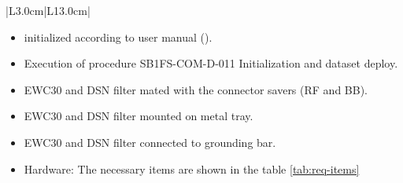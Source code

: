 \begin{table}[H]
\begin{tabular}{|L{3.0cm}|L{13.0cm}|}
\begin{minipage}[t]{\linewidth}
\begin{itemize}[nosep,after=\strut]
 	\item \comEgse initialized according to \comEgse{} user manual ().
				\item Execution of procedure SB1FS-COM-D-011 Initialization and dataset deploy.
				\item EWC30 and DSN filter mated with the connector savers (RF and BB).
				\item EWC30 and DSN filter mounted on \comEgse{} metal tray.
				\item EWC30 and DSN filter connected to grounding bar.
				\item Hardware: The necessary items are shown in the table \ref{tab:req-items} 
			\end{itemize} 
		\end{minipage}\\\hline
	\end{tabular}
	\caption{Procedure \procid{} \ description. } \label{tb:datasetup}
\end{table}

\setcounter{Sec}{0}\setcounter{Step}{0}
\report{}{}{}


